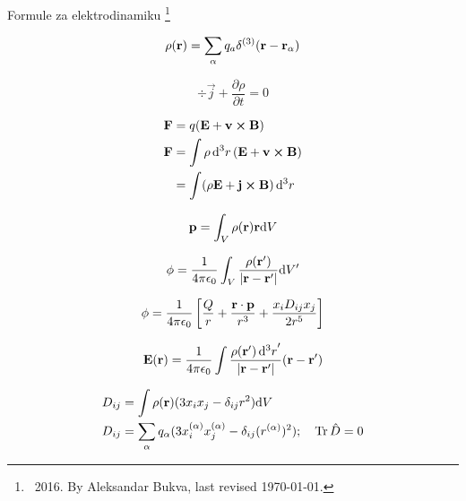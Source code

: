 \documentclass[11pt,twoside]{article}
\date{}
\begin{document}
\begin{center}
Formule za elektrodinamiku \footnote{\textcopyleft \ 2016. By Aleksandar Bukva, last revised \today.}
\end{center}
\normalsize
\begin{multicols}{3}

\begin{footnotesize}

\begin{equation}
\rho(\vb{r}) = \sum_\alpha q_a \delta^{(3)}(\vb{r}-\vb{r_\alpha})
\end{equation}

\begin{equation}
\div\vec{j} + \frac{\partial \rho}{\partial t} = 0
\end{equation}

\begin{equation}
\begin{split}
\vb{F} &= q(\vb{E} + \vb{v}\cross\vb{B}) \\
\vb{F} &= \int \rho \dd[3]{r}(\vb{E} + \vb{v}\cross\vb{B}) \\
&= \int (\rho\vb{E} + \vb{j}\cross\vb{B})\dd[3]{r}
\end{split}
\end{equation}

\begin{equation}
\vb{p} = \int_V \rho(\vb{r}) \vb{r} \dd V
\end{equation}

\begin{equation}
\phi = \frac{1}{4 \pi \epsilon_0} \int_V \frac{\rho(\vb{r'})}{|\vb{r}-\vb{r'}|}\dd V'
\end{equation}

\begin{equation}
\phi = \frac{1}{4 \pi \epsilon_0} \left [\frac{Q}{r} + \frac{\vb{r}\cdot\vb{p}}{r^3} + \frac{x_i D_{ij}x_j}{2r^5} \right ]
\end{equation}

\begin{equation}
\vb{E}(\vb{r}) = \frac{1}{4 \pi \epsilon_0} \int \frac{\rho(\vb{r}')\dd[3]{r}'}{\abs{\vb{r}-\vb{r}'}}(\vb{r}-\vb{r}')
\end{equation}

\begin{equation}
\begin{split}
&D_{ij} = \int \rho(\vb{r})(3x_ix_j-\delta_{ij}r^2)\dd V \\
&D_{ij} = \sum_{\alpha} q_{\alpha} ( 3 x_i^{(\alpha)}x_j^{(\alpha)} - \delta_{ij}(r^{(\alpha)})^2); \quad \Tr\hat{D} =0
\end{split}
\end{equation}


\end{footnotesize}
\end{multicols}
\end{document}
